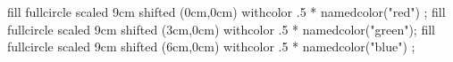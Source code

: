 
\startMPpage
    fill fullcircle scaled 9cm shifted (0cm,0cm) withcolor .5 * namedcolor("red") ;
    fill fullcircle scaled 9cm shifted (3cm,0cm) withcolor .5 * namedcolor("green");
    fill fullcircle scaled 9cm shifted (6cm,0cm) withcolor .5 * namedcolor("blue") ;
\stopMPpage

